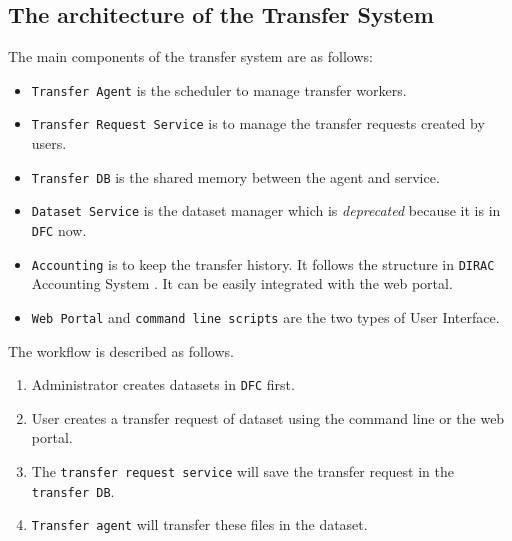 \subsection{The architecture of the Transfer System}
The main components of the transfer system are as follows:
\begin{itemize}
    \item {\tt Transfer Agent} is the scheduler to manage transfer workers.
    \item {\tt Transfer Request Service} is to manage the transfer requests
          created by users.
    \item {\tt Transfer DB} is the shared memory between the agent and 
          service. 
    \item {\tt Dataset Service} is the dataset manager which is 
          {\em deprecated} because it is in {\tt DFC} now.
    \item {\tt Accounting} is to keep the transfer history.
          It follows the structure in {\tt DIRAC} Accounting System
          \cite{bib:diracacct}.
          It can be easily integrated with the web portal.
    \item {\tt Web Portal} and {\tt command line scripts} are the 
          two types of User Interface.
\end{itemize}

The workflow is described as follows.
\begin{enumerate}
\item Administrator creates datasets in {\tt DFC} first. 
\item User creates a transfer request of dataset using the command line 
      or the web portal.
\item The {\tt transfer request service} will save the transfer 
      request in the {\tt transfer DB}.
\item {\tt Transfer agent} will transfer these files in the dataset.
\end{enumerate}

